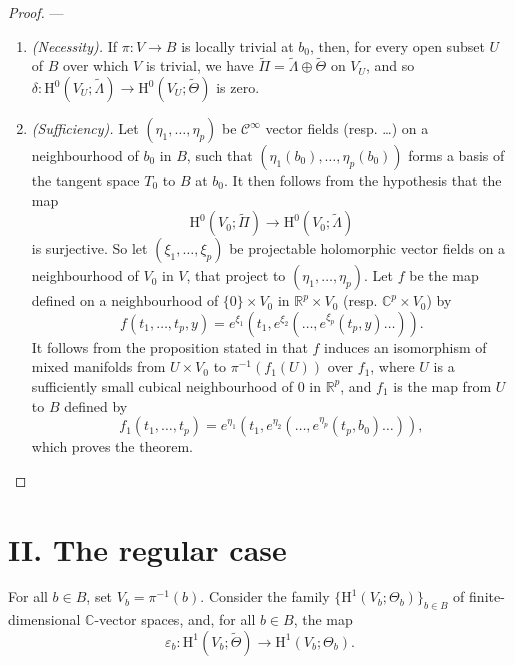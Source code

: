 \documentclass[british]{article}
\newcommand{\oldpage}[1]{\marginpar{\footnotesize$\Big\vert$ \textit{p.~#1}}}
\begin{document}
\begin{proof}
---

\begin{enumerate}
\def\labelenumi{\alph{enumi}.}
\item
  \emph{(Necessity).} If \(\pi\colon V\to B\) is locally trivial at
  \(b_0\), then, for every open subset \(U\) of \(B\) over which \(V\)
  is trivial, we have
  \(\widetilde{\Pi}=\widetilde{\Lambda}\oplus\widetilde{\Theta}\) on
  \(V_U\), and so
  \(\delta\colon\mathrm{H}^0(V_U;\widetilde{\Lambda})\to\mathrm{H}^0(V_U;\widetilde{\Theta})\)
  is zero.
\item
  \emph{(Sufficiency).} Let \((\eta_1,\ldots,\eta_p)\) be
  \(\mathscr{C}^\infty\) vector fields (resp. \ldots) on a neighbourhood
  of \(b_0\) in \(B\), such that \((\eta_1(b_0),\ldots,\eta_p(b_0))\)
  forms a basis of the tangent space \(T_0\) to \(B\) at \(b_0\). It
  then follows from the hypothesis that the map \[
     \mathrm{H}^0(V_0;\widetilde{\Pi}) \to \mathrm{H}^0(V_0;\widetilde{\Lambda})
   \] is surjective. So let \((\xi_1,\ldots,\xi_p)\) be projectable
  holomorphic vector fields on a neighbourhood of \(V_0\) in \(V\), that
  project to \((\eta_1,\ldots,\eta_p)\). Let \(f\) be the map defined on
  a neighbourhood of \(\{0\}\times V_0\) in \(\mathbb{R}^p\times V_0\)
  (resp. \(\mathbb{C}^p\times V_0\)) by \[
     f(t_1,\ldots,t_p,y) = e^{\xi_1}(t_1,e^{\xi_2}(\ldots,e^{\xi_p}(t_p,y)\ldots)).
   \] It follows from the proposition stated in \autocite[Section
  III.2]{3-1} that \(f\) induces an isomorphism of mixed manifolds from
  \(U\times V_0\) to \(\pi^{-1}(f_1(U))\) over \(f_1\), where \(U\) is a
  sufficiently small cubical neighbourhood of \(0\) in \(\mathbb{R}^p\),
  and \(f_1\) is the map from \(U\) to \(B\) defined by \[
     f_1(t_1,\ldots,t_p) = e^{\eta_1}(t_1,e^{\eta_2}(\ldots,e^{\eta_p}(t_p,b_0)\ldots)),
   \] which proves the theorem.
\end{enumerate}

\oldpage{3-03}

\end{proof}

\section*{II. The regular case}\label{three-section-II}

For all \(b\in B\), set \(V_b=\pi^{-1}(b)\). Consider the family
\(\{\mathrm{H}^1(V_b;\Theta_b)\}_{b\in B}\) of finite-dimensional
\(\mathbb{C}\)-vector spaces, and, for all \(b\in B\), the map \[
  \varepsilon_b\colon \mathrm{H}^1(V_b;\widetilde{\Theta}) \to \mathrm{H}^1(V_b;\Theta_b).
\]
\end{document}

